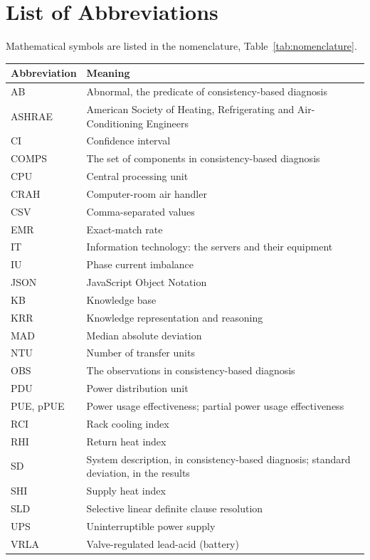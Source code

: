 \chapter*{List of Abbreviations}

Mathematical symbols are listed in the nomenclature, Table~\ref{tab:nomenclature}.

\begin{center}
\begin{tabular}{L{2.4cm}L{11cm}}
  \toprule
  Abbreviation & Meaning \\
  \midrule
  AB & Abnormal, the predicate of consistency-based diagnosis \\
  ASHRAE & American Society of Heating, Refrigerating and Air-Conditioning Engineers \\
  CI & Confidence interval \\
  COMPS & The set of components in consistency-based diagnosis \\
  CPU & Central processing unit \\
  CRAH & Computer-room air handler \\
  CSV & Comma-separated values \\
  EMR & Exact-match rate \\
  IT & Information technology: the servers and their equipment \\
  IU & Phase current imbalance \\
  JSON & JavaScript Object Notation \\
  KB & Knowledge base \\
  KRR & Knowledge representation and reasoning \\
  MAD & Median absolute deviation \\
  NTU & Number of transfer units \\
  OBS & The observations in consistency-based diagnosis \\
  PDU & Power distribution unit \\
  PUE, pPUE & Power usage effectiveness; partial power usage effectiveness \\
  RCI & Rack cooling index \\
  RHI & Return heat index \\
  SD & System description, in consistency-based diagnosis; standard deviation, in the results \\
  SHI & Supply heat index \\
  SLD & Selective linear definite clause resolution \\
  UPS & Uninterruptible power supply \\
  VRLA & Valve-regulated lead-acid (battery) \\
  \bottomrule
\end{tabular}
\end{center}
